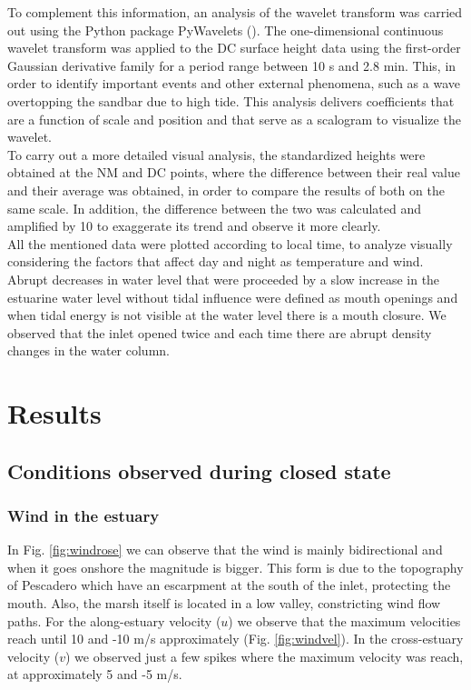 \documentclass[11pt,letterpaper]{article}
\begin{document}
To complement this information, an analysis of the wavelet transform was carried out using the Python package PyWavelets (\cite{lee2019pywavelets}). The one-dimensional continuous wavelet transform was applied to the DC surface height data using the first-order Gaussian derivative family for a period range between 10 s and 2.8 min. This, in order to identify important events and other external phenomena, such as a wave overtopping the sandbar due to high tide. This analysis delivers coefficients that are a function of scale and position and that serve as a scalogram to visualize the wavelet.\\

To carry out a more detailed visual analysis, the standardized heights were obtained at the NM and DC points, where the difference between their real value and their average was obtained, in order to compare the results of both on the same scale. In addition, the difference between the two was calculated and amplified by 10 to exaggerate its trend and observe it more clearly.\\

All the mentioned data were plotted according to local time, to analyze visually considering the factors that affect day and night as temperature and wind. Abrupt decreases in water level that were proceeded by a slow increase in the estuarine water level without tidal influence were defined as mouth openings and when tidal energy is not visible at the water level there is a mouth closure. We observed that the inlet opened twice and each time there are abrupt density changes in the water column.  

\section{Results}

\subsection{Conditions observed during closed state}

\subsubsection{Wind in the estuary}

In Fig. \ref{fig:windrose} we can observe that the wind is mainly bidirectional and when it goes onshore the magnitude is bigger. This form is due to the topography of Pescadero which have an escarpment at the south of the inlet, protecting the mouth. Also, the marsh itself is located in a low valley, constricting wind flow paths. For the along-estuary velocity ($u$) we observe that the maximum velocities reach until 10 and -10 m/s approximately (Fig. \ref{fig:windvel}). In the cross-estuary velocity ($v$) we observed just a few spikes where the maximum velocity was reach, at approximately 5 and -5 m/s.   
\end{document}
